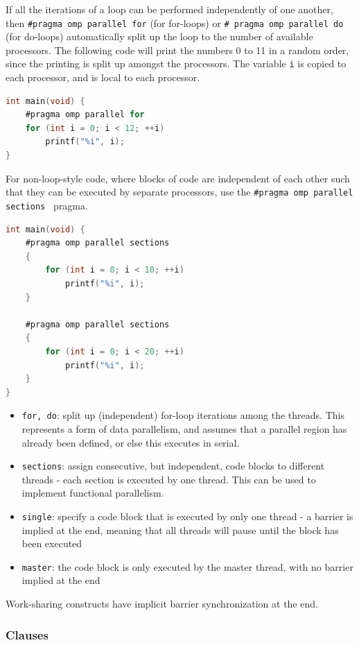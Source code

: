 \documentclass[10pt]{article}
\begin{document}
\begin{flushleft}
If all the iterations of a loop can be performed independently of one another, then {\tt \#pragma omp parallel for} (for for-loops) or {\tt \# pragma omp parallel do} (for do-loops) automatically split up the loop to the number of available processors. The following code will print the numbers 0 to 11 in a random order, since the printing is split up amongst the processors. The variable {\tt i} is copied to each processor, and is local to each processor.

\begin{lstlisting}[language=C, basicstyle=\ttfamily\small]
int main(void) {
	#pragma omp parallel for
	for (int i = 0; i < 12; ++i)
		printf("%i", i);
}
\end{lstlisting}

For non-loop-style code, where blocks of code are independent of each other such that they can be executed by separate processors, use the {\tt \#pragma omp parallel sections {}} pragma.  

\begin{lstlisting}[language=C, basicstyle=\ttfamily\small]
int main(void) {
	#pragma omp parallel sections
	{
		for (int i = 0; i < 10; ++i)
			printf("%i", i);
	}
	
	#pragma omp parallel sections
	{
		for (int i = 0; i < 20; ++i)
			printf("%i", i);
	}
}
\end{lstlisting}

\begin{itemize}
\item {\tt for, do}: split up (independent) for-loop iterations among the threads. This represents a form of data parallelism, and assumes that a parallel region has already been defined, or else this executes in serial.
\item {\tt sections}: assign consecutive, but independent, code blocks to different threads - each section is executed by one thread. This can be used to implement functional parallelism. 
\item {\tt single}: specify a code block that is executed by only one thread - a barrier is implied at the end, meaning that all threads will pause until the block has been executed
\item {\tt master}: the code block is only executed by the master thread, with no barrier implied at the end
\end{itemize}

Work-sharing constructs have implicit barrier synchronization at the end.

\subsubsection{Clauses}


\end{flushleft}
\end{document}
